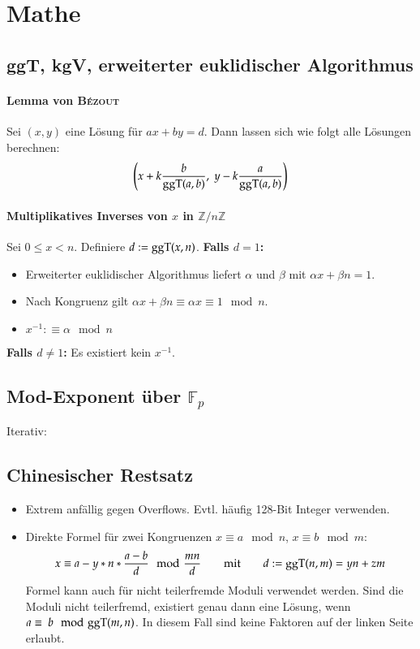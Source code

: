 \section{Mathe}

\subsection{ggT, kgV, erweiterter euklidischer Algorithmus}



\paragraph{Lemma von \textsc{Bézout}}
Sei $(x, y)$ eine Lösung für $ax + by = d$.
Dann lassen sich wie folgt alle Lösungen berechnen:
\[
	\left(x + k\frac{b}{\text{ggT}(a, b)},~y - k\frac{a}{\text{ggT}(a, b)}\right)
\]

\paragraph{Multiplikatives Inverses von $x$ in $\mathbb{Z}/n\mathbb{Z}$}
Sei $0 \leq x < n$. Definiere $d := \text{ggT}(x, n)$.\newline
\textbf{Falls $d = 1$:}
\begin{itemize}[nosep]
	\item Erweiterter euklidischer Algorithmus liefert $\alpha$ und $\beta$ mit
	$\alpha x + \beta n = 1$.
	\item Nach Kongruenz gilt $\alpha x + \beta n \equiv \alpha x \equiv 1 \mod n$.
	\item $x^{-1} :\equiv \alpha \mod n$
	\end{itemize}
\textbf{Falls $d \neq 1$:} Es existiert kein $x^{-1}$.


\subsection{Mod-Exponent über $\mathbb{F}_p$}

Iterativ:


\subsection{Chinesischer Restsatz}
\begin{itemize}
	\item Extrem anfällig gegen Overflows. Evtl. häufig 128-Bit Integer verwenden.
	\item Direkte Formel für zwei Kongruenzen $x \equiv a \mod n$, $x \equiv b \mod m$:
	\[
		x \equiv a - y * n * \frac{a - b}{d} \mod \frac{mn}{d}
		\qquad \text{mit} \qquad
		d := \text{ggT}(n, m) = yn + zm
	\]
	Formel kann auch für nicht teilerfremde Moduli verwendet werden.
	Sind die Moduli nicht teilerfremd, existiert genau dann eine Lösung,
	wenn $a\equiv~b \mod {\text{ggT}}(m, n)$.
	In diesem Fall sind keine Faktoren
	auf der linken Seite erlaubt.
\end{itemize}



